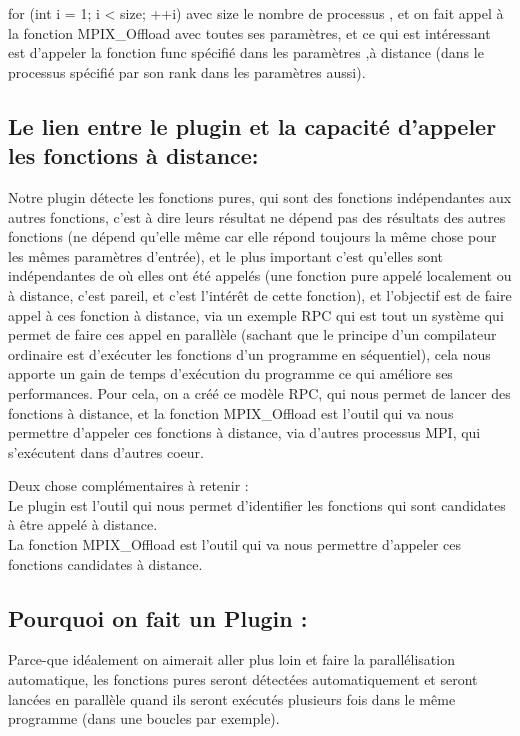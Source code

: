\documentclass[12pt,titlepage]{article}
\begin{document}
for (int i = 1; i < size; ++i) avec size  le nombre de processus , et on fait appel à la fonction MPIX\_Offload avec toutes ses paramètres, et ce qui est intéressant est d'appeler la fonction func spécifié dans les paramètres ,à distance (dans le processus spécifié par son rank dans les paramètres aussi).
\subsection{Le lien entre le plugin et la capacité d'appeler les fonctions à distance:}

Notre plugin détecte les fonctions pures, qui sont des fonctions indépendantes aux autres fonctions, c'est à dire leurs résultat ne dépend pas des résultats des autres fonctions (ne dépend qu'elle même car elle répond toujours la même chose pour les mêmes paramètres d'entrée), et le plus important c'est qu'elles sont indépendantes de où elles ont été appelés (une fonction pure appelé localement ou à distance, c'est pareil, et c'est l'intérêt de cette fonction), et l'objectif est de faire appel à ces fonction à distance, via un exemple RPC qui est tout un système qui permet de faire ces appel en parallèle (sachant que le principe d'un compilateur ordinaire est d’exécuter les fonctions d'un programme en séquentiel), cela nous apporte un gain de temps d’exécution du programme ce qui améliore ses performances.
Pour cela, on a créé ce modèle RPC, qui nous permet de lancer des fonctions à distance, et la fonction MPIX\_Offload est l'outil qui va nous permettre d'appeler ces fonctions à distance, via d'autres processus MPI, qui s'exécutent dans d'autres coeur.

Deux chose complémentaires à retenir :\\
Le plugin est l'outil qui nous permet d'identifier les fonctions qui sont candidates à être appelé à distance.\\
La fonction MPIX\_Offload est l'outil qui va nous permettre d'appeler ces fonctions candidates à distance.
\subsection{Pourquoi on fait un Plugin :}
Parce-que idéalement on aimerait aller plus loin et faire la parallélisation automatique, les fonctions pures seront détectées automatiquement et seront lancées en parallèle quand ils seront exécutés plusieurs fois dans le même programme (dans une boucles par exemple).\\
\end{document}
